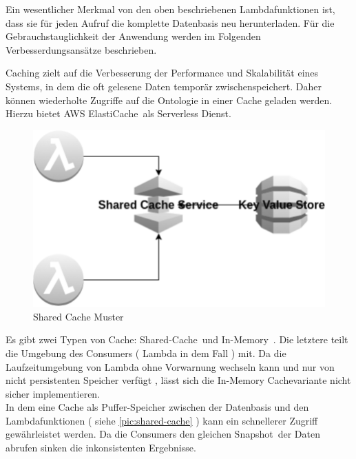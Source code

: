 \documentclass[
12pt,
english,
ngerman,
headsepline,
twoside,
openright,
numbers=noenddot,version=first
]{scrreprt}
\begin{document}

Ein wesentlicher Merkmal von den oben beschriebenen Lambdafunktionen ist, dass sie für jeden Aufruf die komplette Datenbasis neu herunterladen. Für die Gebrauchstauglichkeit der Anwendung werden im Folgenden Verbesserdungsansätze beschrieben.

Caching zielt auf die Verbesserung der Performance und Skalabilität eines Systems, in dem die oft gelesene Daten temporär zwischenspeichert. Daher können wiederholte Zugriffe auf die Ontologie in einer Cache geladen werden. Hierzu bietet \acrshort{AWS} \glqq ElastiCache\grqq\ als Serverless Dienst. 
\begin{figure}[H]
	\begin{center}
\includegraphics[scale=0.60]{./pics/aws/pattern-cache-shared.eps}	
\caption{Shared Cache Muster}	
\label{pic:shared-cache}
	\end{center}
\end{figure}
Es gibt zwei Typen von Cache: \glqq Shared-Cache\grqq\ und \glqq In-Memory\grqq\ \cite{patternsCloud}. Die letztere teilt die Umgebung des Consumers ( Lambda in dem Fall ) mit. Da die Laufzeitumgebung von Lambda ohne Vorwarnung wechseln kann und nur von nicht persistenten Speicher verfügt \cite{lambdaFaq}, lässt sich die In-Memory Cachevariante nicht sicher implementieren.\\

In dem eine Cache als Puffer-Speicher zwischen der Datenbasis und den Lambdafunktionen ( siehe \autoref{pic:shared-cache} ) kann ein schnellerer Zugriff gewährleistet werden. Da die Consumers den gleichen \glqq Snapshot\grqq\ der Daten abrufen sinken die  inkonsistenten Ergebnisse.\cite{patternsCloud}\\
\end{document}
